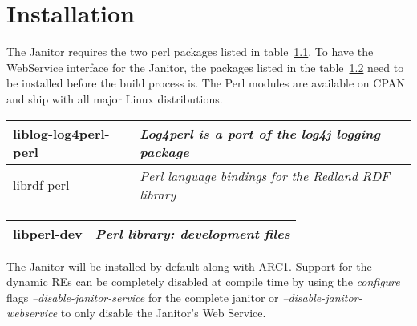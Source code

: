 \chapter{Installation} 




The Janitor requires the two perl packages listed in
table~\ref{tab:install_dependencies}. To have
the WebService interface for the Janitor, the packages listed in the
table~\ref{tab:install_dependencies_optional} need to be installed before
the build process is. The Perl modules are available on CPAN and ship
with all major Linux distributions.

\begin{table}[!h]
   \begin{center}
        \label{tab:install_dependencies}
	\begin{tabular}{|p{3cm}|p{7cm}|}
	\hline
	   liblog-log4perl-perl & \textit{Log4perl is a port of the log4j logging package}\\
	\hline
	   librdf-perl          & \textit{Perl language bindings for the Redland RDF library}\\
	\hline
	\end{tabular} 
   \end{center}
\end{table}
\begin{table}[!h]
   \begin{center}
        \label{tab:install_dependencies_optional}
	\begin{tabular}{|p{3cm}|p{7cm}|}
	\hline
	   libperl-dev & \textit{ Perl library: development files}\\
	\hline
	\end{tabular}
   \end{center}
\end{table}
\forcelinebreak

The Janitor will be installed by default along with ARC1. Support for
the dynamic REs can be completely disabled at compile time by using
the \textit{configure} flags \textit{--disable-janitor-service} for
the complete janitor or \textit{--disable-janitor-webservice} to only
disable the Janitor's Web Service.


